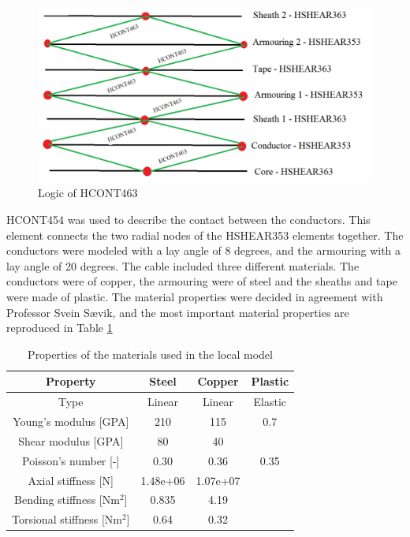 \begin{figure}[H]
\centering
\includegraphics[scale=0.5]{figures/contact}
\caption[$\; \:$ Logic of HCONT463]{Logic of HCONT463}
 \label{fig:contact}
\end{figure}
HCONT454 was used to describe the contact between the conductors. This element connects the two radial nodes of the HSHEAR353 elements together.\newline
\newline
The conductors were modeled with a lay angle of 8 degrees, and the armouring with a lay angle of 20 degrees. \newline
\newline
The cable included three different materials. The conductors were of copper, the armouring were of steel and the sheaths and tape were made of plastic. The material properties were decided in agreement with Professor Svein Sævik, and the most important material properties are reproduced in Table \ref{table:matprop}
\begin{table} [H]
\centering
\begin{tabular}{ |c|c|c|c|}
\hline
Property &Steel & Copper  & Plastic \\
 \hline
 \hline
Type & Linear & Linear & Elastic\\
Young's modulus [GPA] & 210 & 115 & 0.7\\
Shear modulus [GPA]& 80 & 40 &  \\
Poisson's number [-]& 0.30 & 0.36 & 0.35\\
Axial stiffness [N]& 1.48e+06 & 1.07e+07 & \\
Bending stiffness [Nm$^2$] & 0.835 & 4.19 &\\
Torsional stiffness [Nm$^2$] & 0.64 & 0.32&\\
 \hline
\end{tabular}
\caption{Properties of the materials used in the local model}
\label{table:matprop}
\end{table}
